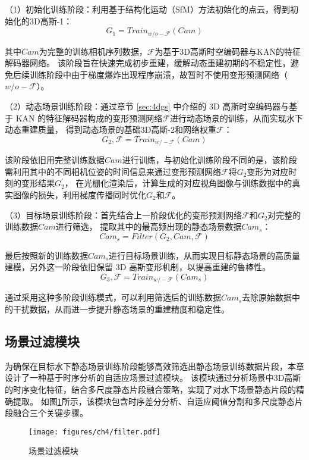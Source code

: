 （1）初始化训练阶段：利用基于结构化运动（SfM）方法\cite{sfm1}\cite{sfm2}初始化的点云，得到初始化的3D高斯-1：
\begin{equation}
    G_1 = Train_{w/o-\mathcal{F} }(Cam)
\end{equation}

其中$Cam$为完整的训练相机序列数据，$\mathcal{F}$为基于3D高斯时空编码器与KAN的特征解码器网络。
该阶段旨在快速完成初步重建，缓解动态重建初期的不稳定性，避免后续训练阶段中由于梯度爆炸出现程序崩溃，故暂时不使用变形预测网络（$w/o-\mathcal{F}$）。

（2）动态场景训练阶段：通过章节 \ref{sec:4dgs} 中介绍的 3D 高斯时空编码器与基于 KAN 的特征解码器构成的变形预测网络$\mathcal{F}$进行动态场景的训练，从而实现水下动态重建质量，
得到动态场景的基础3D高斯-2和网络权重$\mathcal{F}$：
\begin{equation}
    G_2, \mathcal{F} = Train_{w/-\mathcal{F} }(Cam)
\end{equation}

该阶段依旧用完整训练数据$Cam$进行训练，与初始化训练阶段不同的是，该阶段需利用其中的不同相机位姿的时间信息来通过变形预测网络$\mathcal{F}$将$G_2$变形为对应时刻的变形结果$G_2^\prime$，
在光栅化渲染后，计算生成的对应视角图像与训练数据中的真实图像的损失，利用梯度传播同时优化$G_2$和$\mathcal{F}$。

（3）目标场景训练阶段：首先结合上一阶段优化的变形预测网络$\mathcal{F}$和$G_2$对完整的训练数据$Cam$进行筛选，
提取其中的最高频出现的静态场景数据$Cam_s$：
\begin{equation}
    Cam_s = Filter(G_2, Cam, \mathcal{F})
\end{equation}

最后按照新的训练数据$Cam_s$进行目标场景训练，从而实现目标静态场景的高质量建模，另外这一阶段依旧保留 3D 高斯变形机制，以提高重建的鲁棒性。
\begin{equation}
    G_3, \mathcal{F} = Train_{w/-\mathcal{F} }(Cam_s)
\end{equation}

通过采用这种多阶段训练模式，可以利用筛选后的训练数据$Cam_s$去除原始数据中的干扰数据，从而进一步提升静态场景的重建精度和稳定性。

\subsection{场景过滤模块}
为确保在目标水下静态场景训练阶段能够高效筛选出静态场景训练数据片段，本章设计了一种基于时序分析的自适应场景过滤模块。
该模块通过分析场景中3D高斯的时序变化特征，结合多尺度静态片段融合策略，实现了对水下场景静态片段的精确提取。
如图\ref{img:filter}所示，该模块包含时序差分分析、自适应阈值分割和多尺度静态片段融合三个关键步骤。
\begin{figure}[htbp]
    \centering
    \texttt{[image: figures/ch4/filter.pdf]}
    \caption{场景过滤模块}
    \label{img:filter}
\end{figure}

